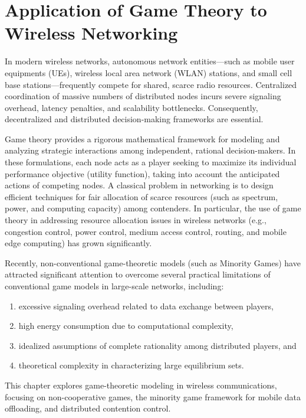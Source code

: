 \chapter{Application of Game Theory to Wireless Networking}
\label{sec:chapter11}

In modern wireless networks, autonomous network entities---such as mobile user equipments (UEs), wireless local area network (WLAN) stations, and small cell base stations---frequently compete for shared, scarce radio resources. Centralized coordination of massive numbers of distributed nodes incurs severe signaling overhead, latency penalties, and scalability bottlenecks. Consequently, decentralized and distributed decision-making frameworks are essential.

Game theory provides a rigorous mathematical framework for modeling and analyzing strategic interactions among independent, rational decision-makers. In these formulations, each node acts as a player seeking to maximize its individual performance objective (utility function), taking into account the anticipated actions of competing nodes. A classical problem in networking is to design efficient techniques for fair allocation of scarce resources (such as spectrum, power, and computing capacity) among contenders. In particular, the use of game theory in addressing resource allocation issues in wireless networks (e.g., congestion control, power control, medium access control, routing, and mobile edge computing) has grown significantly.

Recently, non-conventional game-theoretic models (such as Minority Games) have attracted significant attention to overcome several practical limitations of conventional game models in large-scale networks, including:
\begin{enumerate}
    \item[(a)] excessive signaling overhead related to data exchange between players,
    \item[(b)] high energy consumption due to computational complexity,
    \item[(c)] idealized assumptions of complete rationality among distributed players, and
    \item[(d)] theoretical complexity in characterizing large equilibrium sets.
\end{enumerate}

This chapter explores game-theoretic modeling in wireless communications, focusing on non-cooperative games, the minority game framework for mobile data offloading, and distributed contention control.

